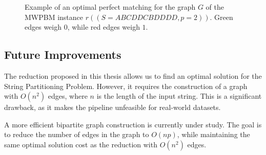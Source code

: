 \begin{example}
\begin{figure}[H]
        \caption[Reduction full example]{Example of an optimal perfect matching for the graph $G$ of the MWPBM instance $r((S = ABCDDCBDDDD, p = 2))$. Green edges weigh $0$, while red edges weigh $1$.}
        \label{fig:reduction_example}
    \end{figure}
\end{example}

\subsection{Future Improvements}
\label{sec:future_improvements}
The reduction proposed in this thesis allows us to find an optimal solution for the String Partitioning Problem. However, it requires the construction of a graph with $O(n^2)$ edges, where $n$ is the length of the input string. This is a significant drawback, as it makes the pipeline unfeasible for real-world datasets. 

A more efficient bipartite graph construction is currently under study. The goal is to reduce the number of edges in the graph to $O(np)$, while maintaining the same optimal solution cost as the reduction with $O(n^2)$ edges.

